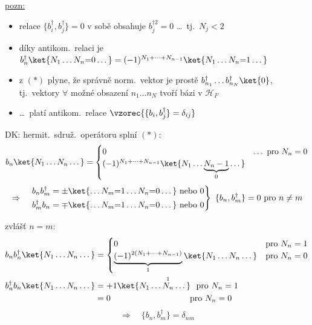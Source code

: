 \underline{pozn:}
\begin{itemize}[nosep]
  \item[--] relace $\{b_i^\dagger,b_j^\dagger\} = 0$ v sobě obsahuje $b_j^{\dagger 2} = 0$ \dots\ tj.\ $N_j < 2$
  \item[--] díky antikom.\ relaci je \quad
        $b_n^\dagger\ket{N_1\dots N_n{=}0\dots} = (-1)^{N_1+\dots+N_{n-1}}\ket{N_1\dots N_n{=}1\dots}$ \quad \pozn{$(*)$}
  \item[--] z $(*)$ plyne, že správně norm.\ vektor je prostě $b_{n_1}^\dagger\dots b_{n_N}^\dagger\ket{0}$, \\
        tj.\ vektory $\forall$ možné obsazení $n_1\dots n_N$ tvoří bázi v $\mathcal{H}_F$
\end{itemize}

\begin{itemize}
  \item \dots\ platí antikom.\ relace \quad $\vzorec{\{b_i,b_j^\dagger\} = \delta_{ij}}$
\end{itemize}
DK: hermit.\ sdruž.\ operátoru splní $(*)$:
\[
  b_n\ket{N_1\dots N_n\dots} = \begin{cases}
    0 & \dots\ \text{pro } N_n = 0 \\
    (-1)^{N_1+\dots+N_{n-1}}\ket{N_1\dots\underbrace{N_n-1}_{0}\dots}
  \end{cases}
\]
\[
  \Rightarrow\quad
  \left.\begin{aligned}
    b_nb_m^\dagger &= \pm\ket{\dots N_m{=}1\dots N_n{=}0\dots}\ \text{nebo } 0 \\
    b_m^\dagger b_n &= \mp\ket{\dots N_m{=}1\dots N_n{=}0\dots}\ \text{nebo } 0
  \end{aligned}\right\}
  \ \{b_n,b_m^\dagger\} = 0 \text{ pro } n\neq m
\]

zvlášť $n = m$:
\begin{align*}
  b_nb_n^\dagger\ket{N_1\dots N_n\dots} &= \begin{cases}
    0 & \text{pro } N_n = 1 \\
    \underbrace{(-1)^{2(N_1+\dots+N_{n-1})}}_{1}\ket{N_1\dots N_n\dots} & \text{pro } N_n = 0
  \end{cases} \\
  b_n^\dagger b_n\ket{N_1\dots N_n\dots} &= +1\ket{N_1\dots\overset{1}{N_n}\dots}\ \ \text{pro } N_n = 1 \\
  &= 0 \hspace{3.3cm} \text{pro } N_n = 0
\end{align*}
\[ \Rightarrow\quad \{b_n,b_m^\dagger\} = \delta_{nm} \]

